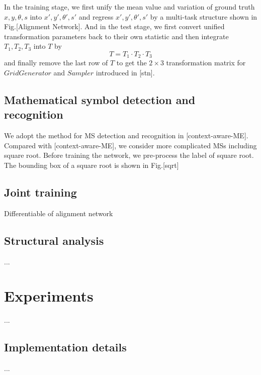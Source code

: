 \documentclass[10pt,conference,a4paper]{IEEEtran}
\begin{document}
	In the training stage, we first unify the mean value and variation of ground truth $x, y, \theta, s$ into $x', y', \theta', s'$ and regress $x', y', \theta', s'$ by a multi-task structure shown in Fig.[Alignment Network]. And in the test stage, we first convert unified transformation parameters back to their own statistic and then integrate $T_1, T_2, T_3$ into $T$ by
	\begin{equation}
		T = T_1 \cdot T_2 \cdot T_3
	\end{equation}
	and finally remove the last row of $T$ to get the $2 \times 3$ transformation matrix for $Grid Generator$ and $Sampler$ introduced in [stn].
		
	\subsection{Mathematical symbol detection and recognition}	
    We adopt the method for MS detection and recognition in [context-aware-ME]. Compared with [context-aware-ME], we consider more complicated MSs including square root.
    Before training the network, we pre-process the label of square root. 
    The bounding box of a square root is shown in Fig.[sqrt]
	\subsection{Joint training}
	Differentiable of alignment network
	\subsection{Structural analysis}
	...
	\section{Experiments}
	...
	\subsection{Implementation details}
	...
\end{document}
